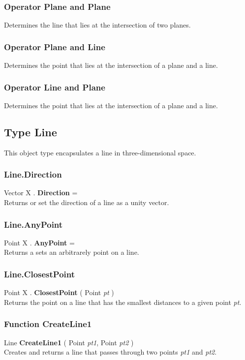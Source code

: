 \documentclass[10pt]{book}
\newcommand{\var}[1]{\textit{#1}}
\begin{document}
\subsubsection{Operator Plane  and  Plane \label{O:Plane and Plane}}
Determines the line that lies at the intersection of two planes.

\subsubsection{Operator Plane  and  Line \label{O:Plane and Line}}
Determines the point that lies at the intersection of a plane and a line.

\subsubsection{Operator Line  and  Plane \label{O:Line and Plane}}
Determines the point that lies at the intersection of a plane and a line.

\subsection{Type Line \label{T:Line}}
This object type encapsulates a line in three-dimensional space.

\subsubsection{Line.Direction \label{F:Line:Direction}}
Vector X . \textbf{Direction} = \\
Returns or set the direction of a line as a unity vector.

\subsubsection{Line.AnyPoint \label{F:Line:AnyPoint}}
Point X . \textbf{AnyPoint} = \\
Returns a sets an arbitrarely point on a line.

\subsubsection{Line.ClosestPoint \label{F:Line:ClosestPoint}}
Point X . \textbf{ClosestPoint} ( Point \textit{pt} ) \\
Returns the point on a line that has the smallest distances to a given point \var{pt}.

\subsubsection{Function CreateLine1 \label{F:CreateLine1}}
Line \textbf{CreateLine1} ( Point \textit{pt1}, Point \textit{pt2} ) \\
Creates and returns a line that passes through two points \var{pt1} and \var{pt2}.
\end{document}

